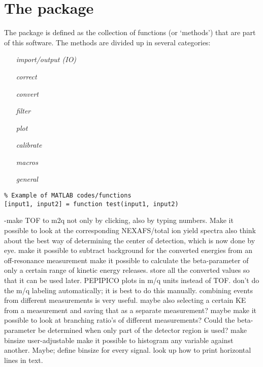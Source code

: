 \newpage
\section{The package}
The package is defined as the collection of functions (or `methods') that are part of this software. The methods are divided up in several categories:
\begin{itemize}
\item[\emph{import/output (IO)}]
\item[\emph{correct}]
\item[\emph{convert}]
\item[\emph{filter}]
\item[\emph{plot}]
\item[\emph{calibrate}]
\item[\emph{macros}]
\item[\emph{general}]
\end{itemize}









\lstset{language=MATLAB}
\begin{lstlisting}
% Example of MATLAB codes/functions
[input1, input2] = function test(input1, input2)
\end{lstlisting}

\if
-make TOF to m2q not only by clicking, also by typing numbers.
Make it possible to look at the corresponding NEXAFS/total ion yield spectra also
think about the best way of determining the center of detection, which is now done by eye.
make it possible to subtract background for the converted energies from an off-resonance measurement
make it possible to calculate the beta-parameter of only a certain range of kinetic energy releases.
store all the converted values so that it can be used later.
PEPIPICO plots in m/q units instead of TOF.
don't do the m/q labeling automatically; it is best to do this manually.
combining events from different measurements is very useful. maybe also selecting a certain KE from a measurement and saving that as a separate measurement?
maybe make it possible to look at branching ratio's of different measurements?
Could the beta-parameter be determined when only part of the detector region is used?
make binsize user-adjustable
make it possible to histogram any variable against another. Maybe; define binsize for every signal.
look up how to print horizontal lines in text.
\fi
